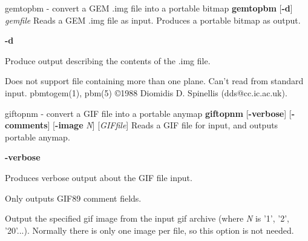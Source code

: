 gemtopbm - convert a GEM .img file into a portable bitmap
{\bf gemtopbm}
{\rm [}{\bf -d}{\rm ]}
{\it gemfile}
Reads a GEM .img file as input.
Produces a portable bitmap as output.
\begin{TPlist}{{\bf -d}}
\item[{{\bf -d}}]
Produce output describing the contents of the .img file.
\end{TPlist}

Does not support file containing more than one plane.
Can't read from standard input.
pbmtogem(1), pbm(5)
\copyright 1988 Diomidis D. Spinellis (dds@cc.ic.ac.uk).
%
 
%

\newpage
%

giftopnm - convert a GIF file into a portable anymap
{\bf giftopnm}
{\rm [}{\bf -verbose}{\rm ]}
{\rm [}{\bf -comments}{\rm ]}
{\rm [}{\bf -image}
{\it N}{\rm ]}
{\rm [}{\it GIFfile}{\rm ]}
Reads a GIF file for input, and outputs portable anymap.
\begin{TPlist}{{\bf -verbose}}
\item[{{\bf -verbose}}]
Produces verbose output about the GIF file input.
\item[{{\bf -comments}}]
Only outputs GIF89 comment fields.
\item[{{\bf -image}}]
Output the specified gif image from the
input gif archive (where
{\it N}
is '1', '2', '20'...).
Normally there is only one image per file, so this option
is not needed.
\end{TPlist}

